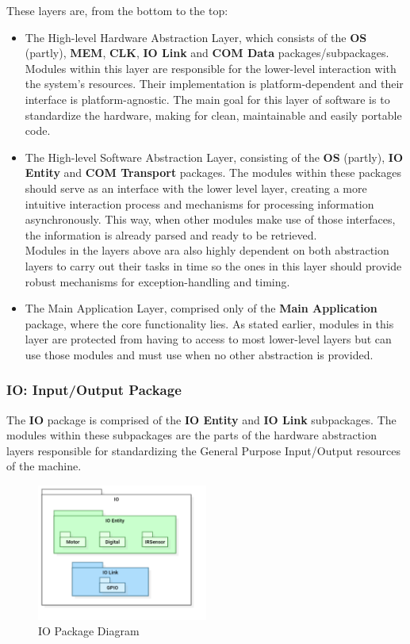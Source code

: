These layers are, from the bottom to the top:
\begin{itemize}
	\item The High-level Hardware Abstraction Layer, which consists of the \textbf{OS} (partly), \textbf{MEM}, \textbf{CLK}, \textbf{IO Link} and \textbf{COM Data} packages/subpackages. Modules within this layer are responsible for the lower-level interaction with the system's resources. Their implementation is platform-dependent and their interface is platform-agnostic. The main goal for this layer of software is to standardize the hardware, making for clean, maintainable and easily portable code. 
	\item The High-level Software Abstraction Layer, consisting of the \textbf{OS} (partly), \textbf{IO Entity} and \textbf{COM Transport} packages. The modules within these packages should serve as an interface with the lower level layer, creating a more intuitive interaction process and mechanisms for processing information asynchronously. This way, when other modules make use of those interfaces, the information is already parsed and ready to be retrieved.\\
	Modules in the layers above ara also highly dependent on both abstraction layers to carry out their tasks in time so the ones in this layer should provide robust mechanisms for exception-handling and timing. 
	\item The Main Application Layer, comprised only of the \textbf{Main Application} package, where the core functionality lies. As stated earlier, modules in this layer are protected from having to access to most lower-level layers but can use those modules and must use when no other abstraction is provided.
\end{itemize}

\subsubsection{IO: Input/Output Package}

The \textbf{IO} package is comprised of the \textbf{IO Entity} and \textbf{IO Link} subpackages. The modules within these subpackages are the parts of the hardware abstraction layers responsible for standardizing the General Purpose Input/Output resources of the machine.

\begin{figure}[H]
	\centering
	\includegraphics[width=0.5\textwidth]{./img/package-diagram-io.png}
	\caption {IO Package Diagram}
	\label{fig:navig-package-diagram-io}
	\end{figure}

